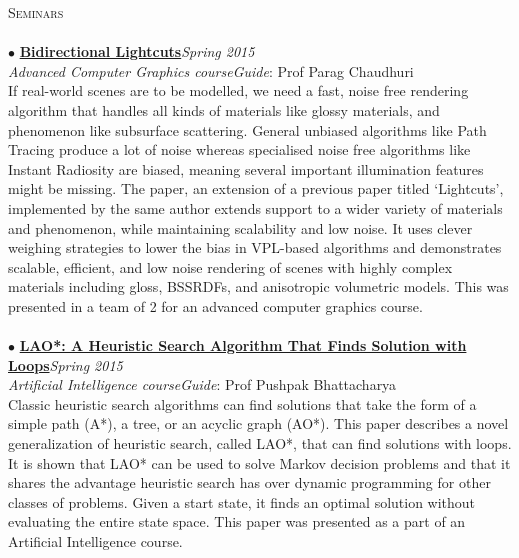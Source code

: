 \documentclass[a4paper,9pt]{article}
\begin{document}
\pagebreak

\textcolor{myrust}{\large{\textsc{Seminars}}}\textcolor{mygray}{\sout{\hfill}}\\\\
\small %
$\bullet$ \href{http://www.cs.cornell.edu/~kb/publications/SIG12BidirLC.pdf}{\textbf{Bidirectional Lightcuts}}\hfill\textit{Spring 2015}\\
\textcolor{mydarkgray}{\textit{Advanced Computer Graphics course}}\hfill\textit{Guide}: \textcolor{mydarkgray}{Prof Parag Chaudhuri}\\
If real-world scenes are to be modelled, we need a fast, noise free rendering algorithm that handles all kinds of materials like glossy materials, and phenomenon like subsurface scattering. General unbiased algorithms like Path Tracing produce a lot of noise whereas specialised noise free algorithms like Instant Radiosity are biased, meaning several important illumination features might be missing. The paper, an extension of a previous paper titled `Lightcuts', implemented by the same author extends support to a wider variety of materials and phenomenon, while maintaining scalability and low noise. It uses clever weighing strategies to lower the bias in VPL-based algorithms and demonstrates scalable, efficient, and low noise rendering of scenes with highly complex materials including gloss, BSSRDFs, and anisotropic volumetric models. This was presented in a team of 2 for an advanced computer graphics course.\\\\
$\bullet$ \href{http://rbr.cs.umass.edu/papers/HZaij01b.pdf}{\textbf{LAO*: A Heuristic Search Algorithm That Finds Solution with Loops}}\hfill\textit{Spring 2015}\\
\textcolor{mydarkgray}{\textit{Artificial Intelligence course}}\hfill\textit{Guide}: \textcolor{mydarkgray}{Prof Pushpak Bhattacharya}\\
Classic heuristic search algorithms can find solutions that take the form of a simple path (A*), a tree, or an acyclic graph (AO*). This paper describes a novel generalization of heuristic search, called LAO*, that can find solutions with loops. It is shown that LAO* can be used to solve Markov decision problems and that it shares the advantage heuristic search has over dynamic programming for other classes of problems. Given a start state, it finds an optimal solution without evaluating the entire state space. This paper was presented as a part of an Artificial Intelligence course.\\\\
\end{document}
